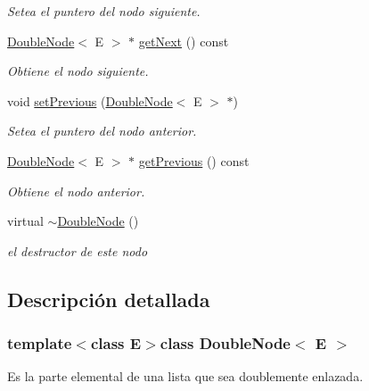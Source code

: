 \begin{DoxyCompactItemize}
\begin{DoxyCompactList}\small\item\em Setea el puntero del nodo siguiente. \end{DoxyCompactList}\item 
\hyperlink{classDoubleNode}{Double\-Node}$<$ E $>$ $\ast$ \hyperlink{classDoubleNode_af5af4a30419b7a7c746361c1476e119f}{get\-Next} () const 
\begin{DoxyCompactList}\small\item\em Obtiene el nodo siguiente. \end{DoxyCompactList}\item 
void \hyperlink{classDoubleNode_aa76c202fdfd533984d9e9ae1892d194d}{set\-Previous} (\hyperlink{classDoubleNode}{Double\-Node}$<$ E $>$ $\ast$)
\begin{DoxyCompactList}\small\item\em Setea el puntero del nodo anterior. \end{DoxyCompactList}\item 
\hyperlink{classDoubleNode}{Double\-Node}$<$ E $>$ $\ast$ \hyperlink{classDoubleNode_a86c75b7ed7e944f9748363fe23b2518e}{get\-Previous} () const 
\begin{DoxyCompactList}\small\item\em Obtiene el nodo anterior. \end{DoxyCompactList}\item 
\hypertarget{classDoubleNode_abd78f421a570cd0fb0cecfedb979d799}{virtual \hyperlink{classDoubleNode_abd78f421a570cd0fb0cecfedb979d799}{$\sim$\-Double\-Node} ()}\label{classDoubleNode_abd78f421a570cd0fb0cecfedb979d799}

\begin{DoxyCompactList}\small\item\em el destructor de este nodo \end{DoxyCompactList}\end{DoxyCompactItemize}


\subsection{Descripción detallada}
\subsubsection*{template$<$class E$>$class Double\-Node$<$ E $>$}

Es la parte elemental de una lista que sea doublemente enlazada. 

